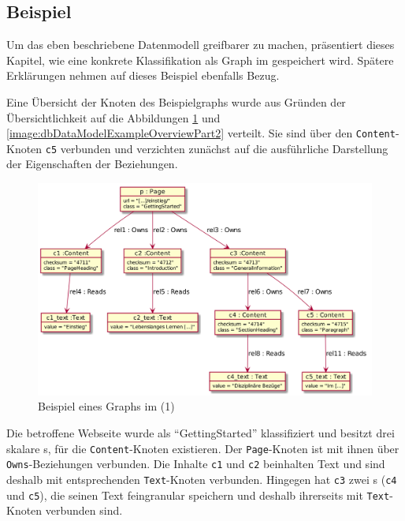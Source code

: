 \subsection{Beispiel}
    \label{section:solutionDetailPersistenceDataModelExample}
    Um das eben beschriebene Datenmodell greifbarer zu machen,
    präsentiert dieses Kapitel, wie eine konkrete Klassifikation als
    Graph im {\classificationStorage} gespeichert wird.
    Spätere Erklärungen nehmen auf dieses Beispiel ebenfalls Bezug.

    Eine Übersicht der Knoten des Beispielgraphs wurde aus Gründen
    der Übersichtlichkeit auf die Abbildungen \ref{image:dbDataModelExampleOverviewPart1}
    und \ref{image:dbDataModelExampleOverviewPart2} verteilt.
    Sie sind über den \texttt{Content}-Knoten \texttt{c5} verbunden
    und verzichten zunächst auf die ausführliche Darstellung der Eigenschaften der Beziehungen.

    \begin{figure}[htb]
        \centering
        \includegraphics[scale=\imageScalingFactor]{../resources/db-data-model/example/example_part1.png}
        \caption{Beispiel eines Graphs im {\classificationStorage} (1)}
        \label{image:dbDataModelExampleOverviewPart1}
    \end{figure}

    Die betroffene Webseite wurde als "`GettingStarted"' klassifiziert und besitzt drei skalare {\contentFeature}s,
    für die \texttt{Content}-Knoten existieren.
    Der \texttt{Page}-Knoten ist mit ihnen über \texttt{Owns}-Beziehungen verbunden.
    Die Inhalte \texttt{c1} und \texttt{c2} beinhalten Text und sind deshalb mit entsprechenden \texttt{Text}-Knoten verbunden.
    Hingegen hat \texttt{c3} zwei {\childFeature}s (\texttt{c4} und \texttt{c5}), die seinen Text feingranular speichern
    und deshalb ihrerseits mit \texttt{Text}-Knoten verbunden sind.

